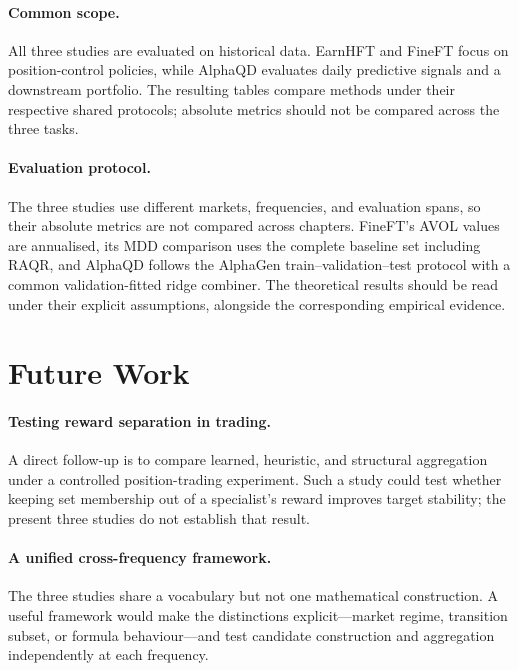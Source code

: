 \paragraph{Common scope.} All three studies are evaluated on historical data. EarnHFT and FineFT focus on position-control policies, while AlphaQD evaluates daily predictive signals and a downstream portfolio. The resulting tables compare methods under their respective shared protocols; absolute metrics should not be compared across the three tasks.

\paragraph{Evaluation protocol.} The three studies use different markets, frequencies, and evaluation spans, so their absolute metrics are not compared across chapters. FineFT's AVOL values are annualised, its MDD comparison uses the complete baseline set including RAQR, and AlphaQD follows the AlphaGen train--validation--test protocol with a common validation-fitted ridge combiner. The theoretical results should be read under their explicit assumptions, alongside the corresponding empirical evidence.

\section{Future Work}
\label{sec:concl_future}

\paragraph{Testing reward separation in trading.} A direct follow-up is to compare learned, heuristic, and structural aggregation under a controlled position-trading experiment. Such a study could test whether keeping set membership out of a specialist's reward improves target stability; the present three studies do not establish that result.

\paragraph{A unified cross-frequency framework.} The three studies share a vocabulary but not one mathematical construction. A useful framework would make the distinctions explicit---market regime, transition subset, or formula behaviour---and test candidate construction and aggregation independently at each frequency.

